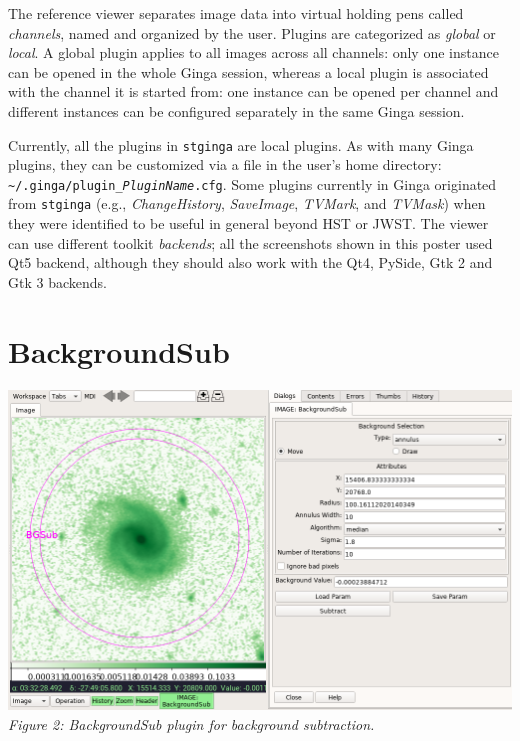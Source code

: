 \documentclass[]{article}
\begin{document}
\begin{multicols}{3}
\para
The reference viewer separates image data into virtual holding pens
called \emph{channels}, named and organized by the user.
Plugins are categorized as \emph{global} or \emph{local}.  A global
plugin applies to all images across all channels: only one instance can
be opened in the whole Ginga session, whereas a local plugin is
associated with the channel it is started from: one instance can be
opened per channel and different instances can be configured separately
in the same Ginga session.

\para
Currently, all the plugins in {\tt stginga} are local plugins.
As with many Ginga plugins, they can be customized via a file in the
user's home directory:
{\tt \textasciitilde/.ginga/plugin\_{\em PluginName}.cfg}.
Some plugins currently in Ginga originated from {\tt stginga}
(e.g., {\em ChangeHistory}, {\em SaveImage}, {\em TVMark}, and {\em TVMask})
when they were identified to be useful in general beyond HST or JWST.
The viewer can use different toolkit \emph{backends};
all the screenshots shown in this poster used Qt5 backend, although they should
also work with the Qt4, PySide, Gtk 2 and Gtk 3 backends.

\section*{BackgroundSub}

\begin{center}
\includegraphics[width=8in]{plugin_backgroundsub} \\
\vspace*{0.4em}
\label{fig:plugin_backgroundsub}
{\small\em Figure 2: BackgroundSub plugin for background subtraction.}
\end{center}


\end{multicols}
\end{document}

